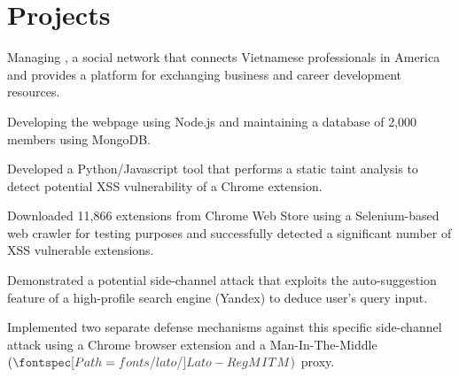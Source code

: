\documentclass[]{deedy_format_Hien}
\begin{document}
\begin{minipage}[t]{0.66\textwidth}
\section{Projects}
\vspace{1mm}
\justify
\begin{tightemize}
\item Managing , a social network that connects Vietnamese professionals in America and provides a platform for exchanging business and career development resources. 
\item Developing the webpage using Node.js and maintaining a database of 2,000 members using MongoDB.
\end{tightemize}
\vspace{\topsep}
\sectionsep

\vspace{1mm}
\justify
\begin{tightemize}
\item Developed a Python/Javascript tool that performs a static taint analysis to detect potential XSS vulnerability of a Chrome extension. 
\item Downloaded 11,866 extensions from Chrome Web Store using a Selenium-based web crawler for testing purposes and successfully detected a significant number of XSS vulnerable extensions.  
\end{tightemize}
\vspace{\topsep}
\sectionsep


\vspace{1mm}
\justify
\begin{tightemize}
\item Demonstrated a potential side-channel attack that exploits the auto-suggestion feature of a high-profile search engine (Yandex) to deduce user's query input. 
\item Implemented two separate defense mechanisms against this specific side-channel attack using a Chrome browser extension and a Man-In-The-Middle $(\custombold{MITM})$ proxy. 
\end{tightemize}
\vspace{\topsep}
\sectionsep



\end{minipage}
\end{document}
